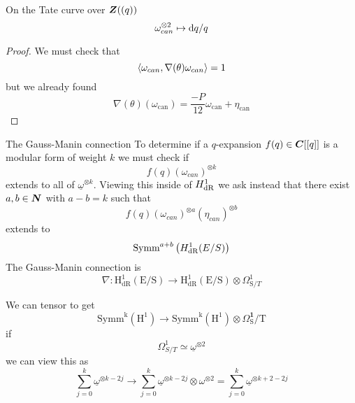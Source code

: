 \begin{frame}
    \begin{lemma}
        On the Tate curve over $\bm{Z}((q))$
        \[
            \omega_{can}^{\otimes 2} \mapsto \mathop{}\!\mathrm{d} q / q
        \]
    \end{lemma}
    \begin{proof}
        We must check that
        \[\left\langle \omega_{can}, \nabla(\theta) \omega_{can} \right\rangle = 1\]
        but we already found
        \[
            \nabla(\theta)\left(\omega_{\mathrm{can}}\right)=\frac{-P}{12} \omega_{\mathrm{can}}+\eta_{\mathrm{can}}
        \]
    \end{proof}
\end{frame}
\begin{frame}{The Gauss-Manin connection}
    To determine if a $q$-expansion $f(q) \in \bm C[[ q]]$ is a modular form of weight $k$ we must check if
    \[f(q) (\omega_{can})^{\otimes k}\]
    extends to all of $\underline \omega^{\otimes k}$.
    Viewing this inside of $H^1_{\mathrm{dR}}$ we ask instead that there exist $a,b\in \bm{N}$ with $a-b = k$ such that
    \[f(q) (\omega_{can})^{\otimes a}(\eta_{can})^{\otimes b}\]
    extends to 
    \[\text{Symm}^{{a+b}}\left({H}_{{\mathrm{dR}}}^{1}({E} / {S})\right) \]\pause
    The Gauss-Manin connection is
    \[
        \nabla: \mathrm{H}_{\mathrm{dR}}^{1}(\mathrm{E} / \mathrm{S}) \longrightarrow \mathrm{H}_{\mathrm{dR}}^{1}(\mathrm{E} / \mathrm{S}) \otimes \Omega_{\mathrm{S}/T}^{1} 
    \]
\end{frame}

\begin{frame}
    We can tensor to get
    \[
        \text {Symm}^{\mathrm{k}}\left(\mathrm{H}^{1}\right) \longrightarrow \text{Symm}^{\mathrm{k}}\left(\mathrm{H}^{1}\right) \otimes \Omega_{\mathrm{S}}^{\mathbf{1}} / \mathrm{T}
    \]
    if
    \[
        \Omega_{S / T}^{1} \simeq \underline{\omega}^{\otimes 2}
    \]
    we can view this as
    \[
    \sum_{{j}=0}^{k} \underline{\omega}^{\otimes {k}-2 {j}} \longrightarrow \sum_{{j}=0}^{{k}} \underline{\omega}^{\otimes {k}-2 {j}} \otimes \omega^{\otimes 2}=\sum_{j=0}^{{k}} \underline{\omega}^{\otimes {k}+2-2 {j}}
    \]
\end{frame}

